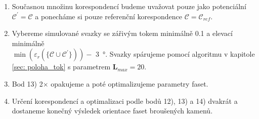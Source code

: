 \begin{enumerate}
\item Současnou množinu korespondencí budeme uvažovat pouze jako potenciální $\mathcal{C}^\prime = \mathcal{C}$ a ponecháme si pouze referenční korespondence $\mathcal{C} = \mathcal{C}_{ref}$. 

\item Vybereme simulované svazky se zářivým tokem minimálně \SI{0.1}{\permille} a elevací minimálně \\ $\min\left( \varepsilon_r( \lbrace\mathcal{C} \cup \mathcal{C}^\prime\rbrace ) \right) - $ \SI{3}{\degree}. Svazky spárujeme pomocí algoritmu v kapitole \ref{sec: poloha_tok} s parametrem $\mathbf{L}_{max} = 20$.

\item Bod 13) 2$\times$ opakujeme a poté optimalizujeme parametry faset. 

\item Určení korespondencí a optimalizaci podle bodů 12), 13) a 14) dvakrát a dostaneme konečný výsledek orientace faset broušených kamenů.

\end{enumerate}

\clearpage
